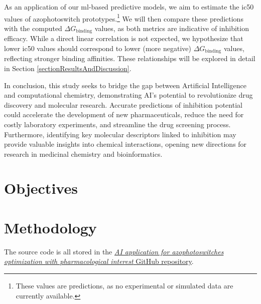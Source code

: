 \documentclass[11pt]{article}
\begin{document}
As an application of our \gls{ml}-based predictive models, we aim to estimate the \gls{ic50} values of azophotoswitch prototypes.\footnote{These values are predictions, as no experimental or simulated data are currently available.} We will then compare these predictions with the computed $\Delta G_{\text{binding}}$ values, as both metrics are indicative of inhibition efficacy. While a direct linear correlation is not expected, we hypothesize that lower \gls{ic50} values should correspond to lower (more negative) $\Delta G_{\text{binding}}$ values, reflecting stronger binding affinities. These relationships will be explored in detail in Section \ref{sectionResultsAndDiscussion}.

In conclusion, this study seeks to bridge the gap between Artificial Intelligence and computational chemistry, demonstrating AI’s potential to revolutionize drug discovery and molecular research. Accurate predictions of inhibition potential could accelerate the development of new pharmaceuticals, reduce the need for costly laboratory experiments, and streamline the drug screening process. Furthermore, identifying key molecular descriptors linked to inhibition may provide valuable insights into chemical interactions, opening new directions for research in medicinal chemistry and bioinformatics.
\newpage
\section{Objectives}



\newpage
\section{Methodology}\label{sectionMethodology}
The source code is all stored in the \href{https://github.com/SirSergi0/Repository---AI-application-for-azophotoswitches-optimization-with-pharmacological-interest}{\emph{AI application for azophotoswitches optimization with pharmacological interest} GitHub repository}\cite{GitHub}.
\end{document}
